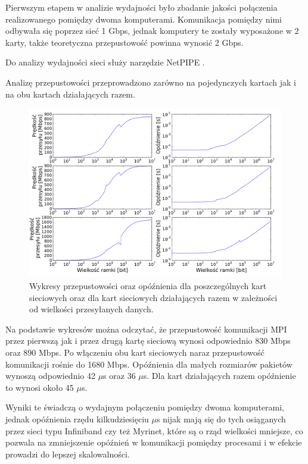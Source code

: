 Pierwszym etapem w analizie wydajności było zbadanie jakości połączenia realizowanego pomiędzy dwoma komputerami. Komunikacja pomiędzy nimi odbywała się poprzez sieć 1 Gbps, jednak komputery te zostały wyposażone w 2 karty, także teoretyczna przepustowość powinna wynosić 2 Gbps. 

Do analizy wydajności sieci służy narzędzie NetPIPE \cite{netpipe}. 

Analizę przepustowości przeprowadzono zarówno na pojedynczych kartach jak i na obu kartach działających razem.

\begin{center}
\begin{figure}[h]
\begin{centering}
\includegraphics[width=150mm]{./rys/speed.png}
\caption{Wykresy przepustowości oraz opóźnienia dla poszczególnych kart sieciowych oraz dla kart sieciowych działających razem w zależności od wielkości przesyłanych danych.}
\end{centering}
\end{figure}
\end{center}

Na podstawie wykresów można odczytać, że przepustowość komunikacji MPI przez pierwszą jak i przez drugą kartę sieciową wynosi odpowiednio 830 Mbps oraz 890 Mbps. Po włączeniu obu kart sieciowych naraz przepustowość komunikacji rośnie do 1680 Mbps. Opóźnienia dla małych rozmiarów pakietów wynoszą odpowiednio 42 $\mu$s oraz 36 $\mu$s. Dla kart działających razem opóźnienie to wynosi około 45 $\mu$s.

Wyniki te świadczą o wydajnym połączeniu pomiędzy dwoma komputerami, jednak opóźnienia rzędu kilkudziesięciu $\mu$s nijak mają się do tych osiąganych przez sieci typu Infiniband czy też Myrinet, które są o rząd wielkości mniejsze, co pozwala na zmniejszenie opóźnień w komunikacji pomiędzy procesami i w efekcie prowadzi do lepszej skalowalności.

